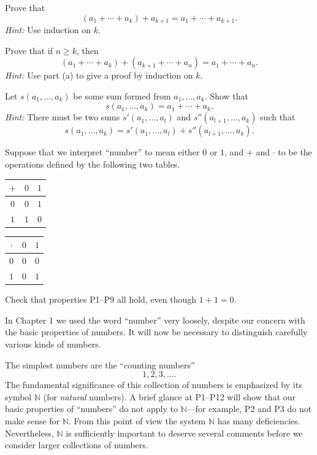 \begin{letters}
\item Prove that
\[
(a_1 + \cdots + a_k) + a_{k+1} = a_1 + \cdots + a_{k+1}.
\]
\textit{Hint:} Use induction on $k$.
\item Prove that if $n \geq k$, then
\[
(a_1 + \cdots + a_k) + (a_{k+1} + \cdots + a_n) = a_1 + \cdots + a_n.
\]
\textit{Hint:} Use part (a) to give a proof by induction on $k$.
\item Let $s(a_1, \dots, a_k)$ be some sum formed from $a_1, \dots, a_k$.
  Show that
\[ s(a_1, \dots, a_k) = a_1 + \cdots + a_k. \]
\textit{Hint:} There must be two sums $s'(a_1, \dots, a_l)$ and
$s''(a_{l+1}, \dots, a_k)$ such that
\[ s(a_1, \dots, a_k) = s'(a_1, \dots, a_l) + s''(a_{l+1}, \dots, a_k). \]
\end{letters}

 Suppose that we interpret ``number'' to mean either $0$ or $1$, and
$+$ and $\cdot$ to be the operations defined by the following two tables.
\begin{center}
\begin{tabular}{c|cc}
$+$ & $0$ & $1$\\ \hline
$0$ & $0$ & $1$\\
$1$ & $1$ & $0$
\end{tabular}
\qquad
\begin{tabular}{c|cc}
$\cdot$ & $0$ & $1$\\ \hline
$0$ & $0$ & $0$\\
$1$ & $0$ & $1$
\end{tabular}
\end{center}
Check that properties P1--P9 all hold, even though $1 + 1 = 0$.


In Chapter 1 we used the word ``number'' very loosely, despite our concern
with the basic properties of numbers. It will now be necessary to distinguish
carefully various kinds of numbers.

The simplest numbers are the ``counting numbers''
\[ 1, 2, 3, \dots . \]
The fundamental significance of this collection of numbers is emphasized by
its symbol $\mathbb{N}$ (for \emph{natural} numbers). A brief glance at
P1--P12 will show that our basic properties of ``numbers'' do not apply to
$\mathbb{N}$---for example, P2 and P3 do not make sense for $\mathbb{N}$. From
this point of view the system $\mathbb{N}$ has many deficiencies.
Nevertheless, $\mathbb{N}$ is sufficiently important to deserve several
comments before we consider larger collections of numbers.

